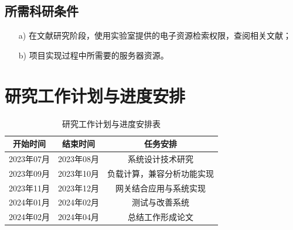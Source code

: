 \subsection{所需科研条件}

\begin{itemize}
    \item[a)] 在文献研究阶段，使用实验室提供的电子资源检索权限，查阅相关文献；
    \item[b)] 项目实现过程中所需要的服务器资源。
\end{itemize}

\newpage

\section{研究工作计划与进度安排}

\begin{table}[H]
    \centering
    \caption{研究工作计划与进度安排表}
    \begin{tabular}{|c|c|c|}
        \hline
        开始时间 & 结束时间 & 任务安排 \\\hline
        2023年07月 & 2023年08月 & 系统设计技术研究 \\\hline
        2023年09月 & 2023年10月 & 负载计算，兼容分析功能实现 \\\hline
        2023年11月 & 2023年12月 & 网关结合应用与系统实现 \\\hline
        2024年01月 & 2024年02月 & 测试与改善系统 \\\hline
        2024年02月 & 2024年04月 & 总结工作形成论文
        \\\hline
    \end{tabular}
\end{table}

\newpage

\nocite{*}%
